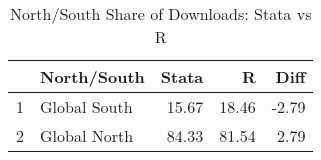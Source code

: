 \begin{table}[ht]
\centering
\begin{tabular}{rlrrr}
  \hline
 & North/South & Stata & R & Diff \\ 
  \hline
1 & Global South & 15.67 & 18.46 & -2.79 \\ 
  2 & Global North & 84.33 & 81.54 & 2.79 \\ 
   \hline
\end{tabular}
\caption{North/South Share of Downloads: Stata vs R} 
\label{tab:ns_compare}
\end{table}
